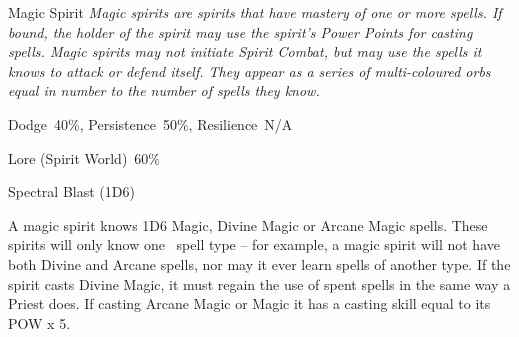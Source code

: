 \begin{monsterbox}{Magic Spirit}
	\textit{Magic spirits are spirits that have mastery of one or more spells. If bound, the holder of the spirit may use the spirit’s Power Points for casting spells. Magic spirits may not initiate Spirit Combat, but may use the spells it knows to attack or defend itself. They appear as a series of multi-coloured orbs equal in number to the number of spells they know.}\\
	\rpghline
	\basics[%
	powerpoints = 14,
	movementrate = 30m,
	plunderrating = 0
	]
	\rpghline%
	\stats[ %
		STR = -,
		CON = -,
		DEX = -,
		SIZ = -,
		INT = 3D6    (11),
		POW = 4D6    (14),
		CHA = 1D6    (4)
	]
	\rpghline%
	\begin{rpg-monsteraction}[Resistances]
		Dodge~40\%, Persistence~50\%, Resilience~N/A
	\end{rpg-monsteraction}
	\begin{rpg-monsteraction}[Knowledge]
		Lore (Spirit World)~60\%
	\end{rpg-monsteraction}
	\begin{rpg-monsteraction}
		Spectral Blast (1D6)
	\end{rpg-monsteraction}
	\begin{rpg-monsteraction}[Magic]
		A magic spirit knows 1D6 Magic, Divine Magic or Arcane Magic spells. These spirits will only know one  spell type – for example, a magic spirit will not have both Divine and Arcane spells, nor may it ever learn spells of another type. If the spirit casts Divine Magic, it must regain the use of spent spells in the same way a Priest does. If casting Arcane Magic or Magic it has a casting skill equal to its POW x 5.
	\end{rpg-monsteraction}
\end{monsterbox}



